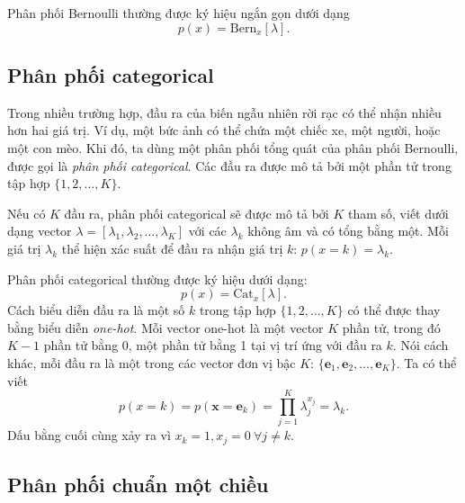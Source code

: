 Phân phối Bernoulli thường được ký hiệu ngắn gọn dưới dạng
\begin{equation}
\label{eqn:30_30}
  p(x) = \text{Bern}_x [\lambda].
\end{equation}

\subsection{Phân phối categorical}
Trong nhiều trường hợp, đầu ra của biến ngẫu nhiên rời rạc có thể nhận nhiều hơn
hai giá trị. Ví dụ, một bức ảnh có thể chứa một chiếc xe, một người, hoặc một
con mèo. Khi đó, ta dùng một phân phối tổng quát của phân phối Bernoulli, được
gọi là \textit{phân phối categorical}. Các đầu ra được mô tả bởi một phần tử
trong tập hợp $\{1, 2, \dots, K\}$.

Nếu có $K$ đầu ra, phân phối categorical sẽ được mô tả bởi $K$ tham số, viết
dưới dạng vector $\lambda = [\lambda_1, \lambda_2, \dots, \lambda_K]$ với các
$\lambda_k$ không âm và có tổng bằng một. Mỗi giá trị $\lambda_k$ thể hiện xác
suất để đầu ra nhận giá trị $k$:
\begin{math}
  p(x = k) = \lambda_k
\end{math}.

Phân phối categorical thường được ký hiệu dưới dạng:
\begin{equation}
  p(x) = \text{Cat}_x [\lambda].
\end{equation}
Cách biểu diễn đầu ra là một số $k$ trong tập hợp $\{1, 2, \dots, K\}$ có thể
được thay bằng biểu diễn \textit{one-hot}. Mỗi vector one-hot là một vector $K$
phần tử, trong đó $K-1$ phần tử bằng 0, một phần tử bằng 1 tại vị trí ứng với
đầu ra $k$. Nói cách khác, mỗi đầu ra là một trong các vector đơn vị bậc $K$:
$\{\mathbf{e}_1, \mathbf{e}_2,\dots, \mathbf{e}_K\}$. Ta có thể viết
\begin{equation}
    \label{eqn:30_31}
    p(x = k) = p(\mathbf{x} = \mathbf{e}_k) = \prod_{j=1}^K \lambda_j^{x_j} = \lambda_k.
\end{equation}
Dấu bằng cuối cùng xảy ra vì $x_k = 1, x_j = 0~\forall j \neq k$.


\subsection{Phân phối chuẩn một chiều}


